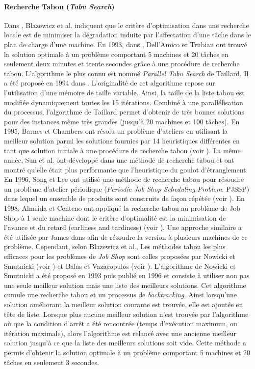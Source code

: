 \paragraph{Recherche Tabou (\textit{Tabu Search})}

Dans \cite{Blazewicz1996}, Blazewicz et al. indiquent que le critère d'optimisation dans une recherche locale est de minimiser la dégradation induite par l'affectation d'une tâche dans le plan de charge d'une machine.
En 1993, dans \cite{DellAmico1993}, Dell'Amico et Trubian ont trouvé la solution optimale à un problème comportant 5 machines et 20 tâches en seulement deux minutes et trente secondes grâce à une procédure de recherche tabou. 
L'algorithme le plus connu est nommé \textit{Parallel Tabu Search} de Taillard. Il a été proposé en 1994 dans \cite{Taillard1994}. L'originalité de cet algorithme repose sur l'utilisation d'une mémoire de taille variable. Ainsi, la taille de la liste tabou est modifiée dynamiquement toutes les 15 itérations. Combiné à une parallélisation du processus, l'algorithme de Taillard permet d'obtenir de très bonnes solutions pour des instances même très grandes (jusqu'à 20 machines et 100 tâches).
En 1995, Barnes et Chambers ont résolu un problème d'ateliers en utilisant la meilleur solution parmi les solutions fournies par 14 heuristiques différentes en tant que solution initiale à une procédure de recherche tabou (voir \cite{Barnes1995}).
La même année, Sun et al. ont développé dans \cite{Sun1995} une méthode de recherche tabou et ont montré qu'elle était plus performante que l'heuristique du goulot d'étranglement.
En 1996, Song et Lee ont utilisé une méthode de recherche tabou pour résoudre un problème d'atelier périodique (\textit{Periodic Job Shop Scheduling Problem}: PJSSP) dans lequel un ensemble de produits sont construits de façon répétée (voir \cite{Song1996}). En 1998, Almeida et Centeno ont appliqué la recherche tabou au problème de Job Shop à 1 seule machine dont le critère d'optimalité est la minimisation de l'avance et du retard (earliness and tardiness) (voir \cite{Almeida1998}). Une approche similaire a été utilisée par James dans \cite{James1997} afin de résoudre la version à plusieurs machines de ce problème.
Cependant, selon Blazewicz et al., Les méthodes tabou les plus efficaces pour les problèmes de \textit{Job Shop} sont celles proposées par Nowicki et Smutnicki (voir \cite{Nowicki1996}) et Balas et Vazacopulos (voir \cite{Balas1998}).
L'algorithme de Nowicki et Smutnicki a été proposé en 1993 puis publié en 1996 et consiste à utiliser non pas une seule meilleur solution mais une liste des meilleurs solutions. Cet algorithme cumule une recherche tabou et un processus de \textit{backtracking}. Ainsi lorsqu'une solution améliorant la meilleur solution courante est trouvée, elle est ajoutée en tête de liste. Lorsque plus aucune meilleur solution n'est trouvée par l'algorithme où que la condition d'arrêt a été rencontrée (temps d'exécution maximum, ou itération maximale), alors l'algorithme est relancé avec une ancienne meilleur solution jusqu'à ce que la liste des meilleurs solutions soit vide. Cette méthode a permis d'obtenir la solution optimale à un problème comportant 5 machines et 20 tâches en seulement 3 secondes.
